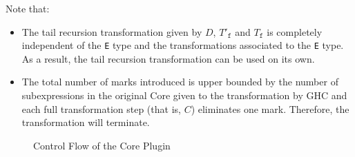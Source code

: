 \documentclass[sigplan,anonymous,review]{acmart}
\newcommand{\ttt}{\texttt}
\begin{document}
Note that:
\begin{itemize}
  \item The tail recursion transformation given by $D$, $T'_{\ttt{f}}$ and $T_{\ttt{f}}$ is completely independent of the \ttt{E} type and the transformations associated to the \ttt{E} type. As a result, the tail recursion transformation can be used on its own.

  \item The total number of marks introduced is upper bounded by the number of
subexpressions in the original Core given to the transformation by GHC and each
full transformation step (that is, $C$) eliminates one mark. Therefore, the
transformation will terminate.
\end{itemize}

\clearpage
\begin{figure}
  \centering 
   \caption{Control Flow of the Core Plugin}
   \label{fig:CorePlugin}
\end{figure}
\end{document}
